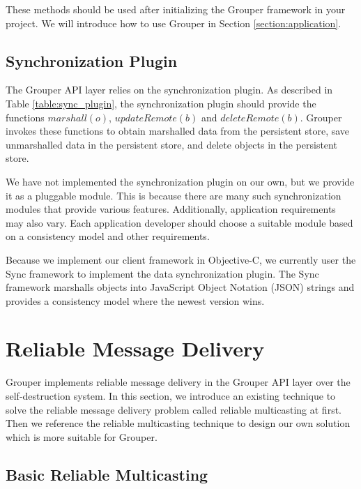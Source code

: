 \documentclass[a4paper,11pt]{report}
\begin{document}
These methods should be used after initializing the Grouper framework in your project.
We will introduce how to use Grouper in Section \ref{section:application}.

\subsection{Synchronization Plugin}

The Grouper API layer relies on the synchronization plugin.
As described in Table \ref{table:sync_plugin}, the synchronization plugin should provide the functions $marshall(o)$, $updateRemote(b)$ and $deleteRemote(b)$.
Grouper invokes these functions to obtain marshalled data from the persistent store, save unmarshalled data in the persistent store, and delete objects in the persistent store.

We have not implemented the synchronization plugin on our own, but we provide it as a pluggable module.
This is because there are many such synchronization modules that provide various features.
Additionally, application requirements may also vary.
Each application developer should choose a suitable module based on a consistency model and other requirements.

Because we implement our client framework in Objective-C, we currently user the Sync framework\cite{sync} to implement the data synchronization plugin.
The Sync framework marshalls objects into JavaScript Object Notation (JSON) strings and provides a consistency model where the newest version wins.

\section{Reliable Message Delivery}  \label{section:reliable_message_delivery}

Grouper implements reliable message delivery in the Grouper API layer over the self-destruction system.
In this section, we introduce an existing technique to solve the reliable message delivery problem called reliable multicasting at first.
Then we reference the reliable multicasting technique to design our own solution which is more suitable for Grouper.

\subsection{Basic Reliable Multicasting}
\end{document}
